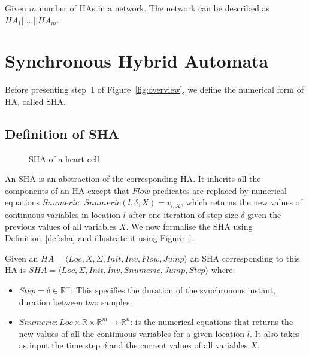 Given  $m$   number of \acp{HA} in a network.
The network can be described as $HA_1 || \dots || HA_m$.


\section{Synchronous Hybrid Automata}
\label{sec:SHA}
 
Before presenting step~1 of Figure~\ref{fig:overview},
we define the numerical form of \ac{HA}, 
called \acf{SHA}.

\subsection{Definition of \acf{SHA}}
\label{sec:defSHA}

\begin{figure}
	\centering
	
	\caption{\acf{SHA} of a heart cell \label{fig:heartCellSHA}}
\end{figure}

An \ac{SHA} is an  abstraction of the corresponding \ac{HA}. 
It inherits all the
components of an \ac{HA} except that $Flow$ predicates are replaced by numerical equations $Snumeric$.
$Snumeric(l,\delta,X)=v_{l,X}$, which returns the new values of
continuous variables in location $l$ after one iteration of step size $\delta$ given the previous values of all variables $X$.
We now formalise
the \ac{SHA} using Definition~\ref{def:sha} and illustrate it using Figure~\ref{fig:heartCellSHA}.



\begin{definition}
	Given an
	$HA = \langle Loc, X, \Sigma, Init, Inv, Flow, Jump \rangle$ an \ac{SHA} corresponding to
	this \ac{HA} is \newline
	$SHA = \langle Loc,  \Sigma, Init, Inv, Snumeric, Jump, Step \rangle$ where:
	\begin{itemize}
		\item $Step = \delta \in \mathbb{R}^+$: This specifies the duration of the synchronous instant,  duration between 
		two samples.
		\item
		$Snumeric: Loc \times \mathbb{R} \times
		\mathbb{R}^m \rightarrow \mathbb{R}^n$:
		is the numerical equations that returns the new values of all the
		continuous variables for a given location $l$.
		It also takes as input the time step $\delta$ and the current values of all variables $X$.
	\end{itemize}
	\label{def:sha}
\end{definition}

